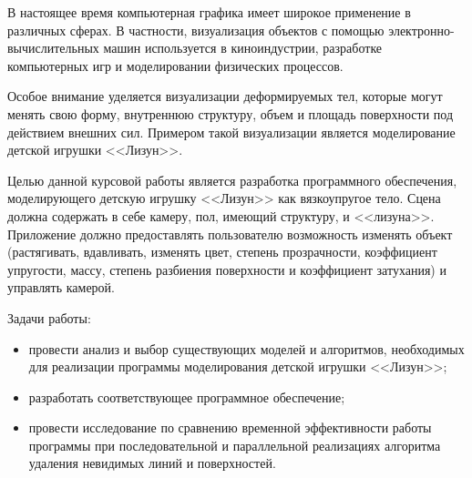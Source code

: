 
В настоящее время компьютерная графика имеет широкое применение в
различных сферах. В частности, визуализация объектов с помощью электронно-вычислительных машин используется в киноиндустрии, разработке компьютерных
игр и моделировании физических процессов.

Особое внимание уделяется визуализации деформируемых тел, которые
могут менять свою форму, внутреннюю структуру, объем и площадь поверхности
под действием внешних сил. Примером такой визуализации является моделирование детской игрушки <<Лизун>>.

Целью данной курсовой работы является разработка программного обеспечения, моделирующего детскую игрушку <<Лизун>> как вязкоупругое тело. Сцена должна содержать в себе камеру, пол, имеющий структуру, и <<лизуна>>. Приложение должно предоставлять пользователю возможность изменять объект (растягивать, вдавливать, изменять цвет, степень прозрачности, коэффициент упругости, массу, степень разбиения поверхности и коэффициент затухания) и управлять камерой.

Задачи работы:
\begin{itemize}
	\item провести анализ и выбор существующих моделей и алгоритмов, необходимых для реализации программы моделирования детской игрушки <<Лизун>>;
	\item разработать соответствующее программное обеспечение;
	\item провести исследование по сравнению временной эффективности работы программы при последовательной и параллельной реализациях алгоритма удаления невидимых линий и поверхностей.
\end{itemize}

\clearpage
